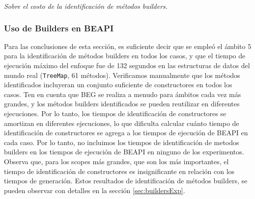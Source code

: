 





\emph{Sobre el costo de la identificación de métodos builders.} 



\subsubsection{Uso de Builders en BEAPI}
Para las conclusiones de esta sección, es suficiente decir que se empleó el ámbito 5 para la identificación de métodos builders en todos los casos, y que el tiempo de ejecución máximo del enfoque fue de 132 segundos en las estructuras de datos del mundo real (\texttt{TreeMap}, 61 métodos). Verificamos manualmente que los métodos identificados incluyeran un conjunto suficiente de constructores en todos los casos. Ten en cuenta que BEG se realiza a menudo para ámbitos cada vez más grandes, y los métodos builders identificados se pueden reutilizar en diferentes ejecuciones. Por lo tanto, los tiempos de identificación de constructores se amortizan en diferentes ejecuciones, lo que dificulta calcular cuánto tiempo de identificación de constructores se agrega a los tiempos de ejecución de \textsf{BEAPI} en cada caso. Por lo tanto, no incluimos los tiempos de identificación de metodos builders en los tiempos de ejecución de \textsf{BEAPI} en ninguno de los experimentos. Observa que, para los scopes más grandes, que son los más importantes, el tiempo de identificación de constructores es insignificante en relación con los tiempos de generación.
Estos resultados de identificación de métodos builders, se pueden observar con detalles en la sección \ref{sec:buildersExp}.




